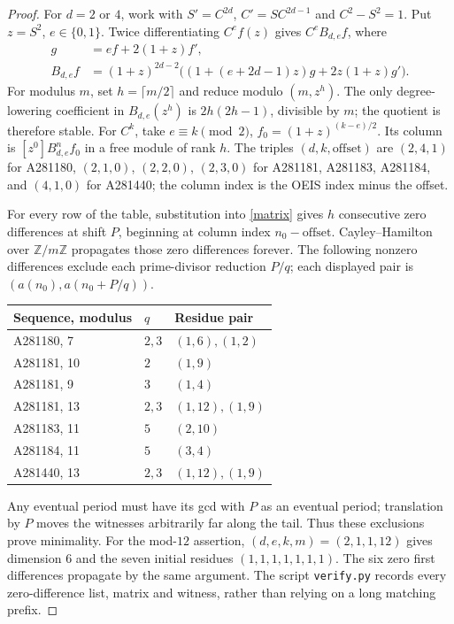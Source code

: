 \documentclass[11pt]{article}
\begin{document}
\begin{proof}
For $d=2$ or $4$, work with $S'=C^{2d}$, $C'=SC^{2d-1}$
and $C^2-S^2=1$. Put $z=S^2$, $e\in\{0,1\}$.
Twice differentiating $C^e f(z)$ gives $C^e B_{d,e}f$, where
\begin{equation}\label{matrix}
 \begin{split}
  g&=ef+2(1+z)f',\\
  B_{d,e}f&=(1+z)^{2d-2}
    \bigl((1+(e+2d-1)z)g+2z(1+z)g'\bigr).
 \end{split}
\end{equation}
For modulus $m$, set $h=\lceil m/2\rceil$ and reduce modulo
$(m,z^h)$. The only degree-lowering coefficient in $B_{d,e}(z^h)$
is $2h(2h-1)$, divisible by $m$; the quotient is therefore stable.
For $C^k$, take $e\equiv k\pmod2$, $f_0=(1+z)^{(k-e)/2}$.
Its column is $[z^0]B_{d,e}^nf_0$ in a free module of rank $h$.
The triples $(d,k,\mathrm{offset})$ are $(2,4,1)$ for A281180,
$(2,1,0)$, $(2,2,0)$, $(2,3,0)$ for A281181, A281183, A281184,
and $(4,1,0)$ for A281440; the column index is the OEIS index
minus the offset.

For every row of the table, substitution into \eqref{matrix}
gives $h$ consecutive zero differences at shift $P$, beginning
at column index $n_0-\mathrm{offset}$. Cayley--Hamilton over
$\mathbb Z/m\mathbb Z$ propagates those zero differences forever.
The following nonzero differences exclude each prime-divisor
reduction $P/q$; each displayed pair is $(a(n_0),a(n_0+P/q))$.
\begin{center}\small
\begin{tabular}{lll}
\toprule
Sequence, modulus & $q$ & Residue pair\\
\midrule
A281180, 7 & $2,3$ & $(1,6),(1,2)$\\
A281181, 10 & $2$ & $(1,9)$\\
A281181, 9 & $3$ & $(1,4)$\\
A281181, 13 & $2,3$ & $(1,12),(1,9)$\\
A281183, 11 & $5$ & $(2,10)$\\
A281184, 11 & $5$ & $(3,4)$\\
A281440, 13 & $2,3$ & $(1,12),(1,9)$\\
\bottomrule
\end{tabular}\end{center}
Any eventual period must have its gcd with $P$ as an eventual period;
translation by $P$ moves the witnesses arbitrarily far along the tail.
Thus these exclusions prove minimality.
For the mod-$12$ assertion, $(d,e,k,m)=(2,1,1,12)$ gives dimension
$6$ and the seven initial residues $(1,1,1,1,1,1,1)$.
The six zero first differences propagate by the same argument.
The script \texttt{verify.py} records every zero-difference list,
matrix and witness, rather than relying on a long matching prefix.
\end{proof}
\end{document}
